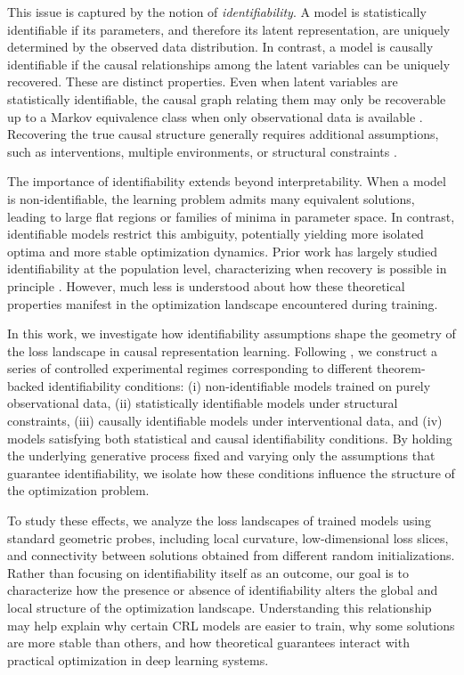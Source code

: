 \documentclass{article} %
\begin{document}
This issue is captured by the notion of \emph{identifiability}. A model is statistically identifiable if its parameters, and therefore its latent representation, are uniquely determined by the observed data distribution. In contrast, a model is causally identifiable if the causal relationships among the latent variables can be uniquely recovered. These are distinct properties. Even when latent variables are statistically identifiable, the causal graph relating them may only be recoverable up to a Markov equivalence class when only observational data is available \cite{Lauritzen1996GraphicalModels, Drton2023MarkovEquivalence}. Recovering the true causal structure generally requires additional assumptions, such as interventions, multiple environments, or structural constraints \cite{Squires2023CausalDiscovery, JiangAragam2023DAGLearning}.

The importance of identifiability extends beyond interpretability. When a model is non-identifiable, the learning problem admits many equivalent solutions, leading to large flat regions or families of minima in parameter space. In contrast, identifiable models restrict this ambiguity, potentially yielding more isolated optima and more stable optimization dynamics. Prior work has largely studied identifiability at the population level, characterizing when recovery is possible in principle \cite{Moran2026CRLFramework}. However, much less is understood about how these theoretical properties manifest in the optimization landscape encountered during training.

In this work, we investigate how identifiability assumptions shape the geometry of the loss landscape in causal representation learning. Following \citet{Moran2026CRLFramework}, we construct a series of controlled experimental regimes corresponding to different theorem-backed identifiability conditions: (i) non-identifiable models trained on purely observational data, (ii) statistically identifiable models under structural constraints, (iii) causally identifiable models under interventional data, and (iv) models satisfying both statistical and causal identifiability conditions. By holding the underlying generative process fixed and varying only the assumptions that guarantee identifiability, we isolate how these conditions influence the structure of the optimization problem.

To study these effects, we analyze the loss landscapes of trained models using standard geometric probes, including local curvature, low-dimensional loss slices, and connectivity between solutions obtained from different random initializations. Rather than focusing on identifiability itself as an outcome, our goal is to characterize how the presence or absence of identifiability alters the global and local structure of the optimization landscape. Understanding this relationship may help explain why certain CRL models are easier to train, why some solutions are more stable than others, and how theoretical guarantees interact with practical optimization in deep learning systems.
\end{document}
